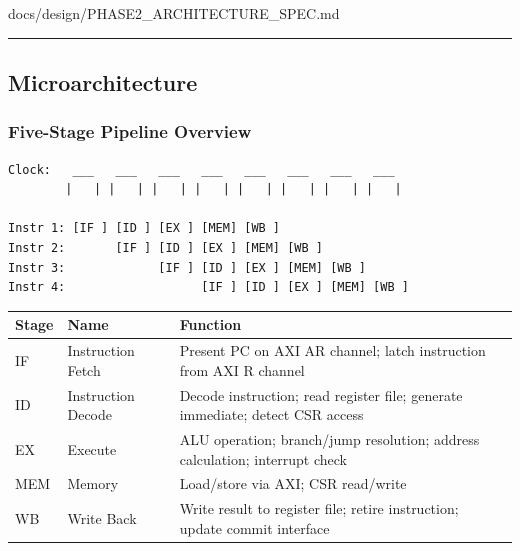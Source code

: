 \begin{relocated}{docs/design/PHASE2_ARCHITECTURE_SPEC.md}
\begin{center}\rule{0.5\linewidth}{0.5pt}\end{center}

\subsection{Microarchitecture}\label{ds:ch:phase2-architecture:2-microarchitecture}

\subsubsection{Five-Stage Pipeline Overview}\label{ds:ch:phase2-architecture:21-five-stage-pipeline-overview}

\begin{lstlisting}[language={}]
Clock:   ___   ___   ___   ___   ___   ___   ___   ___
        |   | |   | |   | |   | |   | |   | |   | |   |

Instr 1: [IF ] [ID ] [EX ] [MEM] [WB ]
Instr 2:       [IF ] [ID ] [EX ] [MEM] [WB ]
Instr 3:             [IF ] [ID ] [EX ] [MEM] [WB ]
Instr 4:                   [IF ] [ID ] [EX ] [MEM] [WB ]
\end{lstlisting}

{
\begin{longtable}[]{@{}
  >{\raggedright\arraybackslash}p{}
  >{\raggedright\arraybackslash}p{}
  >{\raggedright\arraybackslash}p{}@{}}
\toprule\noalign{}
\begin{minipage}[b]{\linewidth}\raggedright
Stage
\end{minipage} & \begin{minipage}[b]{\linewidth}\raggedright
Name
\end{minipage} & \begin{minipage}[b]{\linewidth}\raggedright
Function
\end{minipage} \\
\midrule\noalign{}
\endhead
\bottomrule\noalign{}
\endlastfoot
IF & Instruction Fetch & Present PC on AXI AR channel; latch instruction
from AXI R channel \\
ID & Instruction Decode & Decode instruction; read register file;
generate immediate; detect CSR access \\
EX & Execute & ALU operation; branch/\allowbreak{}jump resolution;
address calculation; interrupt check \\
MEM & Memory & Load/\allowbreak{}store via AXI; CSR
read/\allowbreak{}write \\
WB & Write Back & Write result to register file; retire instruction;
update commit interface \\
\end{longtable}
}


\end{relocated}
